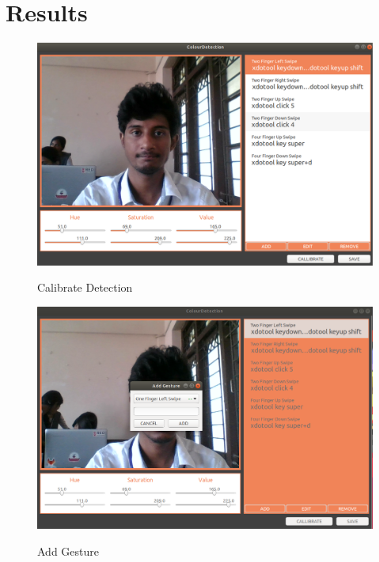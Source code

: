 \documentclass[11pt]{report}
\begin{document}
\chapter{Results}
\begin{figure}[H]
    \includegraphics[width=14cm]{1.png}
    \label{Calibrate Detection}
    \caption{Calibrate Detection}
    \end{figure}

    \begin{figure}[H]
        \includegraphics[width=14cm]{2.png}
        \label{Add Gesture}
        \caption{Add Gesture}
        \end{figure}
\end{document}
